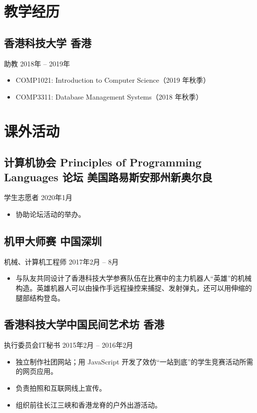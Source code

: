 \documentclass[
  10pt,           %
  autoindent=0pt, %
  scheme=plain,   %
]{ctexart}
\newcommand{\subsec}[2]{\subsection*{#1 \hfill {\normalfont #2}}}
\newcommand{\subsecdesc}[2]{{\kaishu #1 \hfill #2}}
\begin{document}
\section*{教学经历} %

  \subsec{香港科技大学}{香港}
  \subsecdesc{助教}{2018年 -- 2019年}
  \begin{itemize}
    \item COMP1021: Introduction to Computer Science（2019 年秋季）
    \item COMP3311: Database Management Systems（2018 年秋季）
  \end{itemize}

\section*{课外活动} %

  \subsec{计算机协会 Principles of Programming Languages 论坛}{美国路易斯安那州新奥尔良}
  \subsecdesc{学生志愿者}{2020年1月}
  \begin{itemize}
    \item 协助论坛活动的举办。
  \end{itemize}

  \subsec{机甲大师赛}{中国深圳}
  \subsecdesc{机械、计算机工程师}{2017年2月 -- 8月}
  \begin{itemize}
    \item 与队友共同设计了香港科技大学参赛队伍在比赛中的主力机器人“英雄”的机械构造。英雄机器人可以由操作手远程操控来捕捉、发射弹丸，还可以用伸缩的腿部结构登岛。
  \end{itemize}

  \subsec{香港科技大学中国民间艺术坊}{香港}
  \subsecdesc{执行委员会IT秘书}{2015年2月 -- 2016年2月}
  \begin{itemize}
    \item 独立制作社团网站；用 JavaScript 开发了效仿“一站到底”的学生竞赛活动所需的网页应用。
    \item 负责拍照和互联网线上宣传。
    \item 组织前往长江三峡和香港龙脊的户外出游活动。
  \end{itemize}
\end{document}
